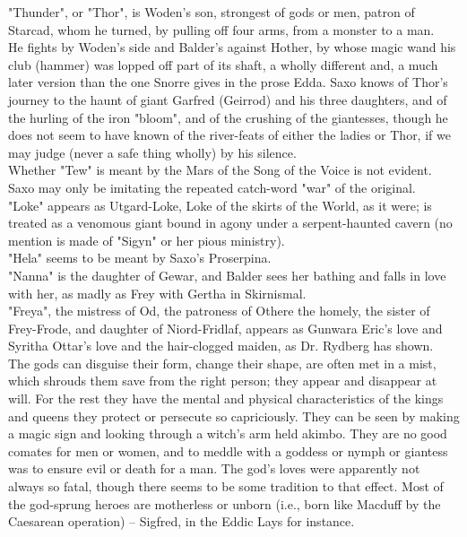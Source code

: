 \documentclass[10pt,a4paper]{report}
\begin{document}
"Thunder", or "Thor", is Woden's son, strongest of gods or men, patron of Starcad, whom he turned, by pulling off four arms, from a monster to a man.\\

He fights by Woden's side and Balder's against Hother, by whose magic wand his club (hammer) was lopped off part of its shaft, a wholly different and, a much later version than the one Snorre gives in the prose Edda. Saxo knows of Thor's journey to the haunt of giant Garfred (Geirrod) and his three daughters, and of the hurling of the iron "bloom", and of the crushing of the giantesses, though he does not seem to have known of the river-feats of either the ladies or Thor, if we may judge (never a safe thing wholly) by his silence.\\

Whether "Tew" is meant by the Mars of the Song of the Voice is not evident. Saxo may only be imitating the repeated catch-word "war" of the original.\\

"Loke" appears as Utgard-Loke, Loke of the skirts of the World, as it were; is treated as a venomous giant bound in agony under a serpent-haunted cavern (no mention is made of "Sigyn" or her pious ministry).\\

"Hela" seems to be meant by Saxo's Proserpina.\\

"Nanna" is the daughter of Gewar, and Balder sees her bathing and falls in love with her, as madly as Frey with Gertha in Skirnismal.\\

"Freya", the mistress of Od, the patroness of Othere the homely, the sister of Frey-Frode, and daughter of Niord-Fridlaf, appears as Gunwara Eric's love and Syritha Ottar's love and the hair-clogged maiden, as Dr. Rydberg has shown.\\

The gods can disguise their form, change their shape, are often met in a mist, which shrouds them save from the right person; they appear and disappear at will. For the rest they have the mental and physical characteristics of the kings and queens they protect or persecute so capriciously. They can be seen by making a magic sign and looking through a witch's arm held akimbo. They are no good comates for men or women, and to meddle with a goddess or nymph or giantess was to ensure evil or death for a man. The god's loves were apparently not always so fatal, though there seems to be some tradition to that effect. Most of the god-sprung heroes are motherless or unborn (i.e., born like Macduff by the Caesarean operation) -- Sigfred, in the Eddic Lays for instance.\\
\end{document}
